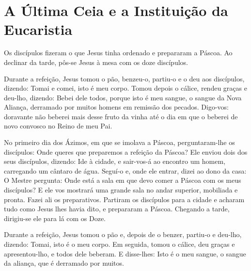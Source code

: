 \documentclass{rosario}
\begin{document}

\section{A Última Ceia e a Instituição da Eucaristia}


Os discípulos fizeram o que Jesus tinha ordenado e prepararam a Páscoa.
Ao declinar da tarde, pôs-se Jesus à mesa com os doze discípulos.

Durante a refeição, Jesus tomou o pão, benzeu-o, partiu-o e o deu aos discípulos, dizendo:
Tomai e comei, isto é meu corpo.
Tomou depois o cálice, rendeu graças e deu-lho, dizendo:
Bebei dele todos, porque isto é meu sangue, o sangue da Nova Aliança, derramado por muitos homens em remissão dos pecados.
Digo-vos:
doravante não beberei mais desse fruto da vinha até o dia em que o beberei de novo convosco no Reino de meu Pai.


No primeiro dia dos Ázimos, em que se imolava a Páscoa, perguntaram-lhe os discípulos:
Onde queres que preparemos a refeição da Páscoa?
Ele enviou dois dos seus discípulos, dizendo: Ide à cidade, e sair-vos-á ao encontro um homem, carregando um cântaro de água.
Seguí-o e, onde ele entrar, dizei ao dono da casa:
O Mestre pergunta: Onde está a sala em que devo comer a Páscoa com os meus discípulos?
E ele vos mostrará uma grande sala no andar superior, mobiliada e pronta.
Fazei ali os preparativos.
Partiram os discípulos para a cidade e acharam tudo como Jesus lhes havia dito, e prepararam a Páscoa.
Chegando a tarde, dirigiu-se ele para lá com os Doze.

Durante a refeição, Jesus tomou o pão e, depois de o benzer, partiu-o e deu-lho, dizendo:
Tomai, isto é o meu corpo.
Em seguida, tomou o cálice, deu graças e apresentou-lho, e todos dele beberam.
E disse-lhes:
Isto é o meu sangue, o sangue da aliança, que é derramado por muitos.

\end{document}
